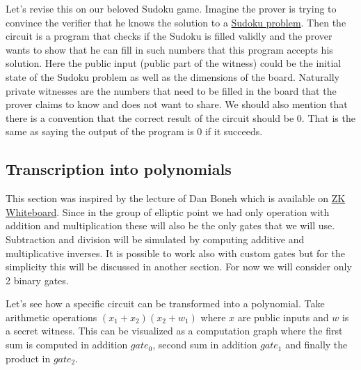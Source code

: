 Let's revise this on our beloved Sudoku game. Imagine the prover is trying to convince the verifier that he knows the solution to a \href{https://en.wikipedia.org/wiki/Sudoku}{Sudoku problem}. Then the circuit is a program that checks if the Sudoku is filled validly and the prover wants to show that he can fill in such numbers that this program accepts his solution. Here the public input (public part of the witness) could be the initial state of the Sudoku problem as well as the dimensions of the board. Naturally private witnesses are the numbers that need to be filled in the board that the prover claims to know and does not want to share. We should also mention that there is a convention that the correct result of the circuit should be 0. That is the same as saying the output of the program is 0 if it succeeds.


\subsection{Transcription into polynomials}
This section was inspired by the lecture of Dan Boneh which is available on \href{https://zkhack.dev/whiteboard/}{ZK Whiteboard}. Since in the group of elliptic point we had only operation with addition and multiplication these will also be the only gates that we will use. Subtraction and division will be simulated by computing additive and multiplicative inverses. It is possible to work also with custom gates but for the simplicity this will be discussed in another section. For now we will consider only 2 binary gates. 

Let's see how a specific circuit can be transformed into a polynomial. Take arithmetic operations $(x_1 + x_2)(x_2 + w_1)$ where $x$ are public inputs and $w$ is a secret witness. This can be visualized as a computation graph where the first sum is computed in addition $gate_0$, second sum in addition $gate_1$ and finally the product in $gate_2$.


